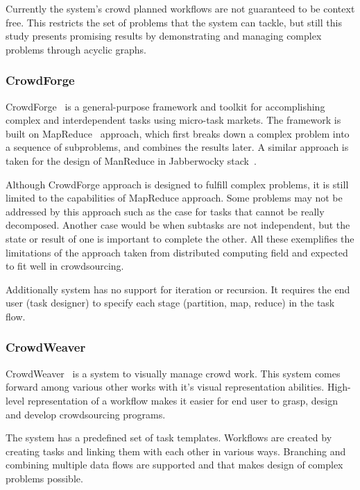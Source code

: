 Currently the system's crowd planned workflows are not guaranteed to be 
context free. This restricts the set of problems that the system can tackle, 
but still this study presents promising results by demonstrating and managing 
complex problems through acyclic graphs.


\subsubsection{CrowdForge}
CrowdForge~\cite{Kittur2011} is a general-purpose framework and toolkit for 
accomplishing complex and interdependent tasks using micro-task markets. 
The framework is built on MapReduce~\cite{Dean2008} approach, which first breaks 
down a complex problem into a sequence of subproblems, and combines the results 
later. A similar approach is taken for the design of ManReduce in Jabberwocky 
stack~\cite{Ahmad2011}.

Although CrowdForge approach is designed to fulfill complex problems, it is still limited 
to the capabilities of MapReduce approach. Some problems may not be addressed 
by this approach such as the case for tasks that cannot be really decomposed. 
Another case would be when subtasks are not independent, but the state 
or result of one is important to complete the other. All these exemplifies the 
limitations of the approach taken from distributed computing field and 
expected to fit well in crowdsourcing.

Additionally system has no support for iteration or recursion. It requires the 
end user (task designer) to specify each stage (partition, map, reduce) in the task flow.


\subsubsection{CrowdWeaver}
CrowdWeaver~\cite{Kittur2012} is a system to visually manage crowd work. 
This system comes forward among various other works with it's visual representation 
abilities. High-level representation of a workflow makes it easier for end user to grasp, 
design and develop crowdsourcing programs.

The system has a predefined set of task templates. Workflows are created by 
creating tasks and linking them with each other in various ways. Branching and 
combining multiple data flows are supported and that makes design of complex 
problems possible. 

